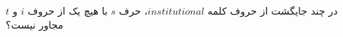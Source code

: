 \p    
در چند جایگشت از حروف کلمه
$institutional$،
 حرف $s$ با هیچ یک از حروف $i$ و $t$ مجاور نیست؟
